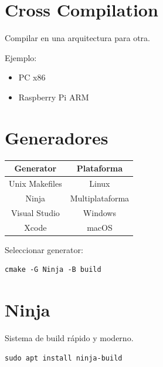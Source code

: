 \documentclass[a4paper,11pt]{article}
\begin{document}

\section*{Cross Compilation}

Compilar en una arquitectura para otra.

Ejemplo:
\begin{itemize}
    \item PC x86
    \item Raspberry Pi ARM
\end{itemize}


\section*{Generadores}

\begin{center}
\begin{tabular}{| c | c |}
\hline
Generator & Plataforma \\
\hline\hline
Unix Makefiles & Linux \\
\hline
Ninja & Multiplataforma \\
\hline
Visual Studio & Windows \\
\hline
Xcode & macOS \\
\hline
\end{tabular}
\end{center}

Seleccionar generator:

\begin{lstlisting}
cmake -G Ninja -B build
\end{lstlisting}


\section*{Ninja}

Sistema de build rápido y moderno.

\begin{lstlisting}
sudo apt install ninja-build
\end{lstlisting}

\end{document}
